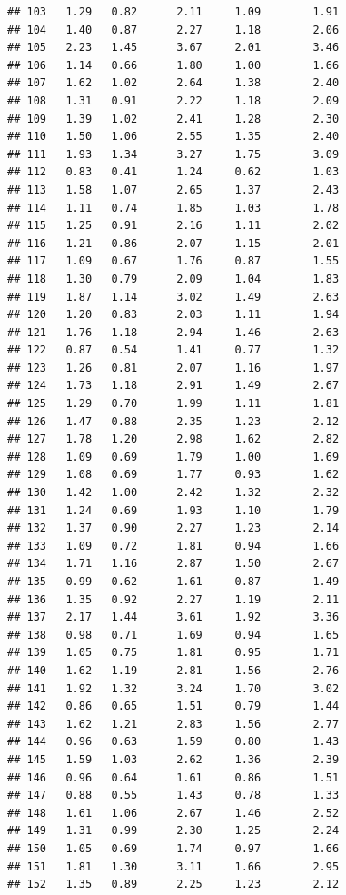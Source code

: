 \documentclass[
]{book}
\theoremstyle{definition}
\theoremstyle{definition}
\theoremstyle{definition}
\theoremstyle{definition}
\theoremstyle{remark}
\begin{document}
\begin{verbatim}
## 103   1.29   0.82      2.11     1.09        1.91
## 104   1.40   0.87      2.27     1.18        2.06
## 105   2.23   1.45      3.67     2.01        3.46
## 106   1.14   0.66      1.80     1.00        1.66
## 107   1.62   1.02      2.64     1.38        2.40
## 108   1.31   0.91      2.22     1.18        2.09
## 109   1.39   1.02      2.41     1.28        2.30
## 110   1.50   1.06      2.55     1.35        2.40
## 111   1.93   1.34      3.27     1.75        3.09
## 112   0.83   0.41      1.24     0.62        1.03
## 113   1.58   1.07      2.65     1.37        2.43
## 114   1.11   0.74      1.85     1.03        1.78
## 115   1.25   0.91      2.16     1.11        2.02
## 116   1.21   0.86      2.07     1.15        2.01
## 117   1.09   0.67      1.76     0.87        1.55
## 118   1.30   0.79      2.09     1.04        1.83
## 119   1.87   1.14      3.02     1.49        2.63
## 120   1.20   0.83      2.03     1.11        1.94
## 121   1.76   1.18      2.94     1.46        2.63
## 122   0.87   0.54      1.41     0.77        1.32
## 123   1.26   0.81      2.07     1.16        1.97
## 124   1.73   1.18      2.91     1.49        2.67
## 125   1.29   0.70      1.99     1.11        1.81
## 126   1.47   0.88      2.35     1.23        2.12
## 127   1.78   1.20      2.98     1.62        2.82
## 128   1.09   0.69      1.79     1.00        1.69
## 129   1.08   0.69      1.77     0.93        1.62
## 130   1.42   1.00      2.42     1.32        2.32
## 131   1.24   0.69      1.93     1.10        1.79
## 132   1.37   0.90      2.27     1.23        2.14
## 133   1.09   0.72      1.81     0.94        1.66
## 134   1.71   1.16      2.87     1.50        2.67
## 135   0.99   0.62      1.61     0.87        1.49
## 136   1.35   0.92      2.27     1.19        2.11
## 137   2.17   1.44      3.61     1.92        3.36
## 138   0.98   0.71      1.69     0.94        1.65
## 139   1.05   0.75      1.81     0.95        1.71
## 140   1.62   1.19      2.81     1.56        2.76
## 141   1.92   1.32      3.24     1.70        3.02
## 142   0.86   0.65      1.51     0.79        1.44
## 143   1.62   1.21      2.83     1.56        2.77
## 144   0.96   0.63      1.59     0.80        1.43
## 145   1.59   1.03      2.62     1.36        2.39
## 146   0.96   0.64      1.61     0.86        1.51
## 147   0.88   0.55      1.43     0.78        1.33
## 148   1.61   1.06      2.67     1.46        2.52
## 149   1.31   0.99      2.30     1.25        2.24
## 150   1.05   0.69      1.74     0.97        1.66
## 151   1.81   1.30      3.11     1.66        2.95
## 152   1.35   0.89      2.25     1.23        2.12

\end{verbatim}
\end{document}
